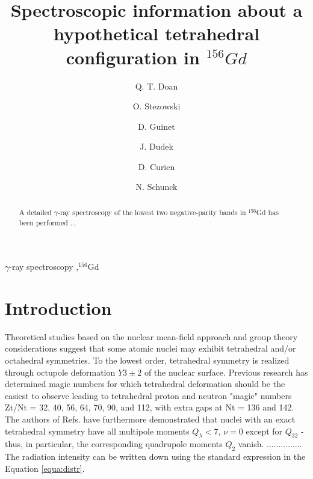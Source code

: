 \documentclass[5p,12pt]{elsarticle}
\begin{document}
\begin{frontmatter}

\title{Spectroscopic information about a hypothetical tetrahedral configuration in $^{156}Gd$}

\author[ipnl]{Q. T. Doan}
\author[ipnl,ucbl]{O. Stezowski}
\author[ipnl,ucbl]{D. Guinet}
\author[iphc]{J. Dudek}
\author[iphc]{D. Curien}
\author[pan]{N. Schunck}

\address[ipnl]{Institut de Physique Nucl\'eaire de Lyon, France}

\address[ucbl]{Universit\'e de Lyon, Universit\'e Lyon 1, Lyon, France}

\address[iphc]{Departement de Recherches Subatomiques, Institut Pluridisciplinaire Hubert Curien, Strasbourg, France}

\address[pan]{Institute of Nuclear Physics PAN, PL-31-342 Krak\'ow, Poland}

 

\begin{abstract}
A detailed $\gamma$-ray spectroscopy of the lowest two negative-parity bands in $^{156}$Gd has been performed ...
\end{abstract}

\begin{keyword}
$\gamma$-ray spectroscopy \sep $^{156}$Gd
\end{keyword}

\end{frontmatter}



\section{Introduction}
\label{sec:intro}

Theoretical studies based on the nuclear mean-field approach and group theory considerations suggest \cite{bib_dudek2006, bib_schunk2006} that some atomic nuclei may exhibit tetrahedral and/or octahedral symmetries. To the lowest order, tetrahedral symmetry is realized through octupole deformation $Y3\pm 2$ of the nuclear surface. Previous research\cite{bib_dudek2002} has determined magic numbers for which tetrahedral deformation should be the easiest to observe leading to tetrahedral proton and neutron "magic" numbers Zt/Nt = 32, 40, 56, 64, 70, 90, and 112, with extra gaps at Nt = 136 and 142. The authors of Refs. \cite{bib_dudek2006, bib_schunk2006, bib_dudek2002} have furthermore demonstrated that nuclei with an exact tetrahedral symmetry have all multipole moments $Q_\lambda < 7$, $\nu = 0$ except for $Q_{32}$ - thus, in particular, the corresponding quadrupole moments $Q_2$ vanish.
...............
The radiation intensity can be written down using the standard expression in the Equation \ref{equa:distr}.
\end{document}
